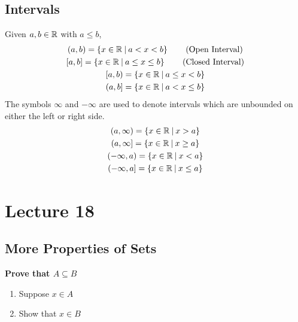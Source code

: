 \documentclass{report}
\begin{document}
\subsection*{Intervals}
Given $a,b\in\mathbb{R}$ with $a\leq b$,
\begin{gather*}
	(a,b) = \braces{x\in\bbr\suchthat a < x < b} \tag*{(\text{Open Interval})} \\
	[a,b] = \braces{x\in\bbr\suchthat a \leq x \leq b} \tag*{(\text{Closed Interval})} \\
	[a,b) = \braces{x\in\bbr\suchthat a \leq x < b} \\
	(a,b] = \braces{x\in\bbr\suchthat a < x \leq b} \\
\end{gather*}
The symbols $\infty$ and $-\infty$ are used to denote intervals which are unbounded on either the left or right side.
\begin{gather*}
	(a, \infty) = \left\lbrace x\in\mathbb{R}\medspace\middle|\medspace x > a \right\rbrace \\
	(a, \infty] = \left\lbrace x\in\mathbb{R}\medspace\middle|\medspace x \geq a \right\rbrace \\
	(-\infty, a) = \left\lbrace x\in\mathbb{R}\medspace\middle|\medspace x < a \right\rbrace \\
	(-\infty, a] = \left\lbrace x\in\mathbb{R}\medspace\middle|\medspace x \leq a \right\rbrace \\
\end{gather*} 

\section{Lecture 18}
\subsection*{More Properties of Sets}
\textbf{Prove that $A\subseteq B$}
\begin{enumerate}
	\item Suppose $x\in A$
	\item Show that $x\in B$
\end{enumerate}
\end{document}
